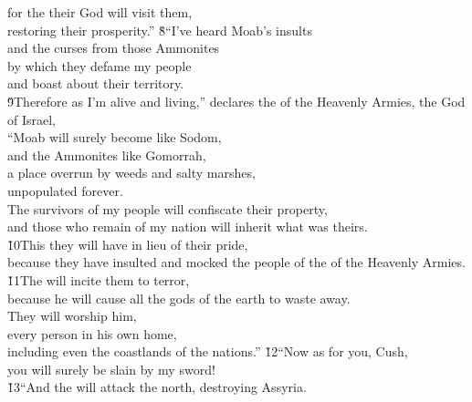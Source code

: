 \begin{poetry}
\poeml for the  their God will visit them, \\
\poemll    restoring their prosperity.''
\poeml \v{8}``I've heard Moab's insults \\
\poemll    and the curses from those Ammonites \\
\poeml by which they defame my people \\
\poemll    and boast about their territory. \\
\poeml \v{9}Therefore as I'm alive and living,'' declares the  of the Heavenly Armies, the God of Israel, \\
\poemll    ``Moab will surely become like Sodom, \\
\poemlll       and the Ammonites like Gomorrah, \\
\poeml a place overrun by weeds and salty marshes, \\
\poemll    unpopulated forever. \\
\poeml The survivors of my people will confiscate their property, \\
\poemll    and those who remain of my nation will inherit what was theirs. \\
\poeml \v{10}This they will have in lieu of their pride, \\
\poemll    because they have insulted and mocked the people of the  of the Heavenly Armies. \\
\poeml \v{11}The  will incite them to terror, \\
\poemll    because he will cause all the gods of the earth to waste away. \\
\poeml They will worship him, \\
\poemll    every person in his own home, \\
\poemlll       including even the coastlands of the nations.''
\poeml \v{12}``Now as for you, Cush, \\
\poemll    you will surely be slain by my sword! \\
\poeml \v{13}``And the  will attack the north, destroying Assyria. \\

\end{poetry}
